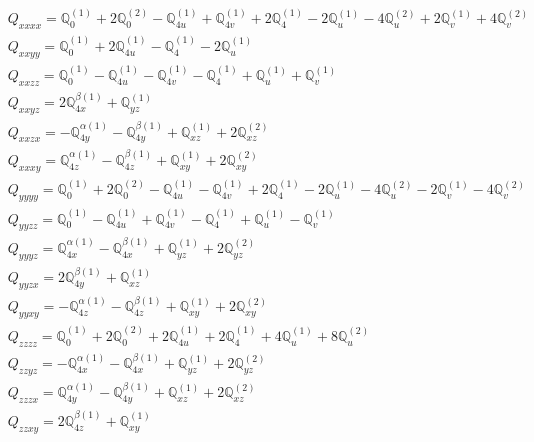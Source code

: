 \documentclass[fleqn,8pt,landscape]{jsarticle}
\begin{document}
\begin{align*}
& Q_{xxxx} = \mathbb{Q}_{0}^{(1)} + 2 \mathbb{Q}_{0}^{(2)} - \mathbb{Q}_{4u}^{(1)} + \mathbb{Q}_{4v}^{(1)} + 2 \mathbb{Q}_{4}^{(1)} - 2 \mathbb{Q}_{u}^{(1)} - 4 \mathbb{Q}_{u}^{(2)} + 2 \mathbb{Q}_{v}^{(1)} + 4 \mathbb{Q}_{v}^{(2)} \\
& Q_{xxyy} = \mathbb{Q}_{0}^{(1)} + 2 \mathbb{Q}_{4u}^{(1)} - \mathbb{Q}_{4}^{(1)} - 2 \mathbb{Q}_{u}^{(1)} \\
& Q_{xxzz} = \mathbb{Q}_{0}^{(1)} - \mathbb{Q}_{4u}^{(1)} - \mathbb{Q}_{4v}^{(1)} - \mathbb{Q}_{4}^{(1)} + \mathbb{Q}_{u}^{(1)} + \mathbb{Q}_{v}^{(1)} \\
& Q_{xxyz} = 2 \mathbb{Q}_{4x}^{\beta(1)} + \mathbb{Q}_{yz}^{(1)} \\
& Q_{xxzx} = - \mathbb{Q}_{4y}^{\alpha(1)} - \mathbb{Q}_{4y}^{\beta(1)} + \mathbb{Q}_{xz}^{(1)} + 2 \mathbb{Q}_{xz}^{(2)} \\
& Q_{xxxy} = \mathbb{Q}_{4z}^{\alpha(1)} - \mathbb{Q}_{4z}^{\beta(1)} + \mathbb{Q}_{xy}^{(1)} + 2 \mathbb{Q}_{xy}^{(2)} \\
& Q_{yyyy} = \mathbb{Q}_{0}^{(1)} + 2 \mathbb{Q}_{0}^{(2)} - \mathbb{Q}_{4u}^{(1)} - \mathbb{Q}_{4v}^{(1)} + 2 \mathbb{Q}_{4}^{(1)} - 2 \mathbb{Q}_{u}^{(1)} - 4 \mathbb{Q}_{u}^{(2)} - 2 \mathbb{Q}_{v}^{(1)} - 4 \mathbb{Q}_{v}^{(2)} \\
& Q_{yyzz} = \mathbb{Q}_{0}^{(1)} - \mathbb{Q}_{4u}^{(1)} + \mathbb{Q}_{4v}^{(1)} - \mathbb{Q}_{4}^{(1)} + \mathbb{Q}_{u}^{(1)} - \mathbb{Q}_{v}^{(1)} \\
& Q_{yyyz} = \mathbb{Q}_{4x}^{\alpha(1)} - \mathbb{Q}_{4x}^{\beta(1)} + \mathbb{Q}_{yz}^{(1)} + 2 \mathbb{Q}_{yz}^{(2)} \\
& Q_{yyzx} = 2 \mathbb{Q}_{4y}^{\beta(1)} + \mathbb{Q}_{xz}^{(1)} \\
& Q_{yyxy} = - \mathbb{Q}_{4z}^{\alpha(1)} - \mathbb{Q}_{4z}^{\beta(1)} + \mathbb{Q}_{xy}^{(1)} + 2 \mathbb{Q}_{xy}^{(2)} \\
& Q_{zzzz} = \mathbb{Q}_{0}^{(1)} + 2 \mathbb{Q}_{0}^{(2)} + 2 \mathbb{Q}_{4u}^{(1)} + 2 \mathbb{Q}_{4}^{(1)} + 4 \mathbb{Q}_{u}^{(1)} + 8 \mathbb{Q}_{u}^{(2)} \\
& Q_{zzyz} = - \mathbb{Q}_{4x}^{\alpha(1)} - \mathbb{Q}_{4x}^{\beta(1)} + \mathbb{Q}_{yz}^{(1)} + 2 \mathbb{Q}_{yz}^{(2)} \\
& Q_{zzzx} = \mathbb{Q}_{4y}^{\alpha(1)} - \mathbb{Q}_{4y}^{\beta(1)} + \mathbb{Q}_{xz}^{(1)} + 2 \mathbb{Q}_{xz}^{(2)} \\
& Q_{zzxy} = 2 \mathbb{Q}_{4z}^{\beta(1)} + \mathbb{Q}_{xy}^{(1)} \\

\end{align*}
\end{document}
